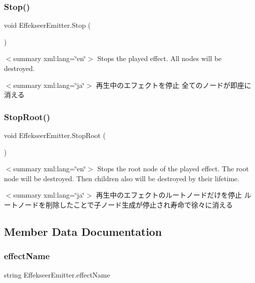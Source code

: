 \subsubsection{\texorpdfstring{Stop()}{Stop()}}
{\footnotesize\ttfamily void Effekseer\+Emitter.\+Stop (\begin{DoxyParamCaption}{ }\end{DoxyParamCaption})\hspace{0.3cm}{\ttfamily [inline]}}

$<$summary xml\+:lang=\char`\"{}en\char`\"{}$>$ Stops the played effect. All nodes will be destroyed. 

$<$summary xml\+:lang=\char`\"{}ja\char`\"{}$>$ 再生中のエフェクトを停止 全てのノードが即座に消える \mbox{\label{class_effekseer_emitter_a6bb4daefa3632e823b684ba575043290}} 
\subsubsection{\texorpdfstring{Stop\+Root()}{StopRoot()}}
{\footnotesize\ttfamily void Effekseer\+Emitter.\+Stop\+Root (\begin{DoxyParamCaption}{ }\end{DoxyParamCaption})\hspace{0.3cm}{\ttfamily [inline]}}

$<$summary xml\+:lang=\char`\"{}en\char`\"{}$>$ Stops the root node of the played effect. The root node will be destroyed. Then children also will be destroyed by their lifetime. 

$<$summary xml\+:lang=\char`\"{}ja\char`\"{}$>$ 再生中のエフェクトのルートノードだけを停止 ルートノードを削除したことで子ノード生成が停止され寿命で徐々に消える 

\subsection{Member Data Documentation}
\mbox{\label{class_effekseer_emitter_a3c52af81c057a2f4ea0848cb492cf208}} 
\subsubsection{\texorpdfstring{effect\+Name}{effectName}}
{\footnotesize\ttfamily string Effekseer\+Emitter.\+effect\+Name}

